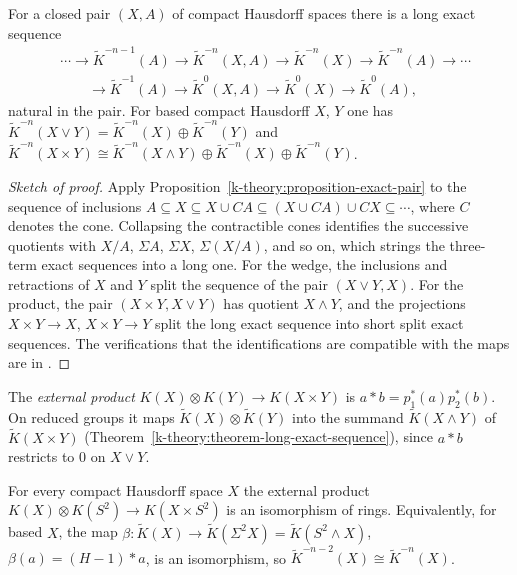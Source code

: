 \begin{theorem}\label{k-theory:theorem-long-exact-sequence}
For a closed pair $(X, A)$ of compact Hausdorff spaces there is a long exact sequence
\[
\begin{aligned}
&\cdots \to \tilde{K}^{-n-1}(A) \to \tilde{K}^{-n}(X, A) \to \tilde{K}^{-n}(X) \to \tilde{K}^{-n}(A) \to \cdots \\
&\qquad \to \tilde{K}^{-1}(A) \to \tilde{K}^0(X, A) \to \tilde{K}^0(X) \to \tilde{K}^0(A),
\end{aligned}
\]
natural in the pair. For based compact Hausdorff $X$, $Y$ one has $\tilde{K}^{-n}(X \vee Y) = \tilde{K}^{-n}(X) \oplus \tilde{K}^{-n}(Y)$ and
$\tilde{K}^{-n}(X \times Y) \cong \tilde{K}^{-n}(X \wedge Y) \oplus \tilde{K}^{-n}(X) \oplus \tilde{K}^{-n}(Y)$.
\end{theorem}

\begin{proof}[Sketch of proof]
Apply Proposition~\ref{k-theory:proposition-exact-pair} to the sequence of inclusions $A \subseteq X \subseteq X \cup CA \subseteq (X \cup CA) \cup CX \subseteq \cdots$, where $C$ denotes the cone.
Collapsing the contractible cones identifies the successive quotients with $X/A$, $\Sigma A$, $\Sigma X$, $\Sigma(X/A)$, and so on, which strings the three-term exact sequences into a long one. For the wedge,
the inclusions and retractions of $X$ and $Y$ split the sequence of the pair $(X \vee Y, X)$. For the product, the pair $(X \times Y, X \vee Y)$ has quotient $X \wedge Y$, and the projections $X \times Y \to X$,
$X \times Y \to Y$ split the long exact sequence into short split exact sequences. The verifications that the identifications are compatible with the maps are in \cite[Chapter 2]{hatcher-vbkt}.
\end{proof}

\begin{definition}\label{k-theory:definition-external-product}
The \emph{external product} $K(X) \otimes K(Y) \to K(X \times Y)$ is $a * b = p_1^*(a)p_2^*(b)$. On reduced groups it maps $\tilde{K}(X) \otimes \tilde{K}(Y)$ into the summand
$\tilde{K}(X \wedge Y)$ of $\tilde{K}(X \times Y)$ (Theorem~\ref{k-theory:theorem-long-exact-sequence}), since $a * b$ restricts to $0$ on $X \vee Y$.
\end{definition}

\begin{theorem}\label{k-theory:theorem-bott}
For every compact Hausdorff space $X$ the external product $K(X) \otimes K(S^2) \to K(X \times S^2)$ is an isomorphism of rings. Equivalently, for based $X$, the map
$\beta \colon \tilde{K}(X) \to \tilde{K}(\Sigma^2X) = \tilde{K}(S^2 \wedge X)$, $\beta(a) = (H - 1) * a$, is an isomorphism, so $\tilde{K}^{-n-2}(X) \cong \tilde{K}^{-n}(X)$.
\end{theorem}

